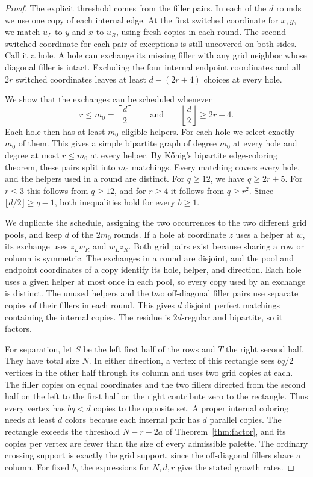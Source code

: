 \begin{proof}
The explicit threshold comes from the filler pairs. In each of the \(d\) rounds we use one copy of each internal edge. At the first switched coordinate for \(x,y\), we match \(u_L\) to \(y\) and \(x\) to \(u_R\), using fresh copies in each round. The second switched coordinate for each pair of exceptions is still uncovered on both sides. Call it a hole. A hole can exchange its missing filler with any grid neighbor whose diagonal filler is intact. Excluding the four internal endpoint coordinates and all \(2r\) switched coordinates leaves at least \(d-(2r+4)\) choices at every hole.

We show that the exchanges can be scheduled whenever
\[
 r\le m_0=\left\lceil\frac d2\right\rceil
 \qquad\text{and}\qquad
 \left\lfloor\frac d2\right\rfloor\ge 2r+4.
\]
Each hole then has at least \(m_0\) eligible helpers. For each hole we select exactly \(m_0\) of them. This gives a simple bipartite graph of degree \(m_0\) at every hole and degree at most \(r\le m_0\) at every helper. By K\H{o}nig's bipartite edge-coloring theorem, these pairs split into \(m_0\) matchings. Every matching covers every hole, and the helpers used in a round are distinct. For \(q\ge12\), we have \(q\ge2r+5\). For \(r\le3\) this follows from \(q\ge12\), and for \(r\ge4\) it follows from \(q\ge r^2\). Since \(\lfloor d/2\rfloor\ge q-1\), both inequalities hold for every \(b\ge1\).

We duplicate the schedule, assigning the two occurrences to the two different grid pools, and keep \(d\) of the \(2m_0\) rounds. If a hole at coordinate \(z\) uses a helper at \(w\), its exchange uses \(z_Lw_R\) and \(w_Lz_R\). Both grid pairs exist because sharing a row or column is symmetric. The exchanges in a round are disjoint, and the pool and endpoint coordinates of a copy identify its hole, helper, and direction. Each hole uses a given helper at most once in each pool, so every copy used by an exchange is distinct. The unused helpers and the two off-diagonal filler pairs use separate copies of their fillers in each round. This gives \(d\) disjoint perfect matchings containing the internal copies. The residue is \(2d\)-regular and bipartite, so it factors.

For separation, let \(S\) be the left first half of the rows and \(T\) the right second half. They have total size \(N\). In either direction, a vertex of this rectangle sees \(bq/2\) vertices in the other half through its column and uses two grid copies at each. The filler copies on equal coordinates and the two fillers directed from the second half on the left to the first half on the right contribute zero to the rectangle. Thus every vertex has \(bq<d\) copies to the opposite set. A proper internal coloring needs at least \(d\) colors because each internal pair has \(d\) parallel copies. The rectangle exceeds the threshold \(N-r-2a\) of Theorem~\ref{thm:factor}, and its copies per vertex are fewer than the size of every admissible palette. The ordinary crossing support is exactly the grid support, since the off-diagonal fillers share a column. For fixed \(b\), the expressions for \(N,d,r\) give the stated growth rates.
\end{proof}

